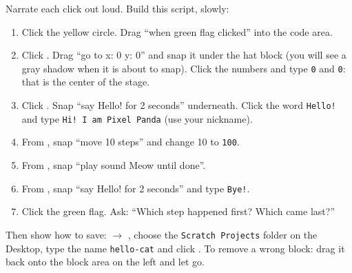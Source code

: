 \begin{workedexample}
Narrate each click out loud. Build this script, slowly:
\par\noindent\begin{minipage}[t]{0.56\linewidth}
\begin{enumerate}[leftmargin=1.4em,itemsep=1pt]
  \item Click the yellow  circle. Drag \enquote{when green flag clicked} into the code area.
  \item Click . Drag \enquote{go to x: 0 y: 0} and snap it under the hat block (you will see a gray shadow when it is about to snap). Click the numbers and type \texttt{0} and \texttt{0}: that is the center of the stage.
  \item Click . Snap \enquote{say Hello! for 2 seconds} underneath. Click the word \texttt{Hello!} and type \texttt{Hi! I am Pixel Panda} (use your nickname).
  \item From , snap \enquote{move 10 steps} and change 10 to \texttt{100}.
  \item From , snap \enquote{play sound Meow until done}.
  \item From , snap \enquote{say Hello! for 2 seconds} and type \texttt{Bye!}.
  \item Click the green flag. Ask: \enquote{Which step happened first? Which came last?}
\end{enumerate}
\end{minipage}\hfill
\begin{minipage}[t]{0.40\linewidth}\vspace{4pt}\centering
\begin{scratch}[scale=0.68]
\end{scratch}
\end{minipage}

Then show how to save:  $\rightarrow$ , choose the \texttt{Scratch Projects} folder on the Desktop, type the name \texttt{hello-cat} and click . To remove a wrong block: drag it back onto the block area on the left and let go.
\end{workedexample}

